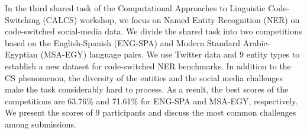 In the third shared task of the Computational Approaches to Linguistic Code-Switching (CALCS) workshop, we focus on Named Entity Recognition (NER) on code-switched social-media data. We divide the shared task into two competitions based on the English-Spanish (ENG-SPA) and Modern Standard Arabic-Egyptian (MSA-EGY) language pairs. We use Twitter data and 9 entity types to establish a new dataset for code-switched NER benchmarks. In addition to the CS phenomenon, the diversity of the entities and the social media challenges make the task considerably hard to process. As a result, the best scores of the competitions are 63.76\% and 71.61\% for ENG-SPA and MSA-EGY, respectively. We present the scores of 9 participants and discuss the most common challenges among submissions.
